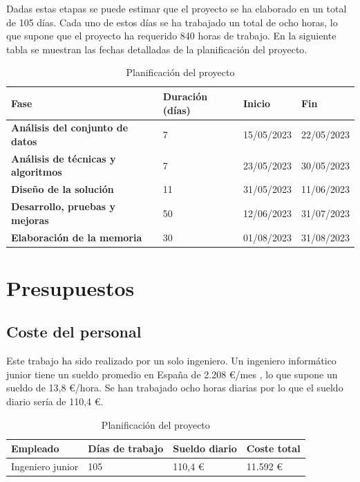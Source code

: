 \documentclass[12pt]{report} %
\begin{document}
	Dadas estas etapas se puede estimar que el proyecto se ha elaborado en un total de 105 días. Cada uno de estos días se ha trabajado un total de
	ocho horas, lo que supone que el proyecto ha requerido 840 horas de trabajo. En la siguiente tabla se muestran las fechas detalladas
	de la planificación del proyecto.

	\begin{table}[H]
		\centering
		\caption{Planificación del proyecto}
		\begin{tabular}{llll}
				\toprule
				\textbf{Fase} & \textbf{Duración (días)} & \textbf{Inicio} & \textbf{Fin}\\
				\midrule
				\textbf{Análisis del conjunto de datos} & 7 & 15/05/2023 & 22/05/2023  \\
				\textbf{Análisis de técnicas y algoritmos} & 7 & 23/05/2023 & 30/05/2023 \\
				\textbf{Diseño de la solución} & 11 & 31/05/2023 & 11/06/2023 \\
				\textbf{Desarrollo, pruebas y mejoras} & 50 & 12/06/2023 & 31/07/2023 \\
				\textbf{Elaboración de la memoria} & 30 & 01/08/2023 & 31/08/2023 \\
				\bottomrule
		\end{tabular}
	\end{table}

	\section{Presupuestos}
	
	\subsection{Coste del personal}
	Este trabajo ha sido realizado por un solo ingeniero. Un ingeniero informático junior tiene un sueldo promedio en España
	de 2.208 €/mes \cite{sueldo}, lo que supone un sueldo de 13,8 €/hora. Se han trabajado ocho horas diarias por lo que el sueldo
	diario sería de 110,4 €.

	\begin{table}[H]
		\centering
		\caption{Planificación del proyecto}
		\begin{tabular}{llll}
				\toprule
				\textbf{Empleado} & \textbf{Días de trabajo} & \textbf{Sueldo diario} & \textbf{Coste total}\\
				\midrule
				Ingeniero junior & 105 & 110,4 € & 11.592 €  \\
				\bottomrule
		\end{tabular}
	\end{table}
\end{document}

